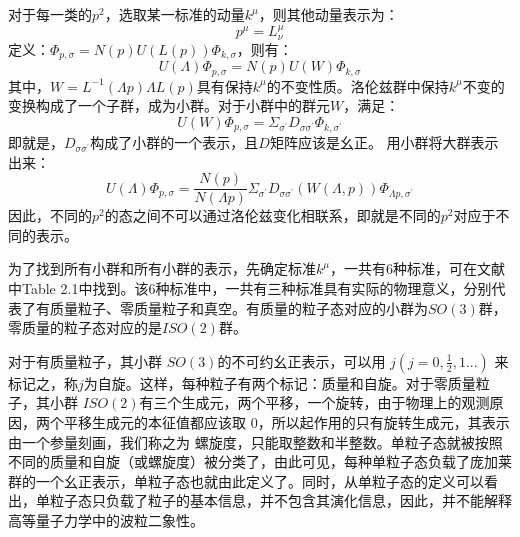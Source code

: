 \documentclass[10pt,a4paper]{article}
\begin{document}
对于每一类的$p^2$，选取某一标准的动量$k^{\mu}$，则其他动量表示为：
\begin{equation}
\label{eq:12}
p^{\mu}=L^{\mu}_{\nu}
\end{equation}
定义：$\Phi_{p,\sigma}=N(p)U(L(p))\Phi_{k,\sigma}$，则有：
\begin{equation}
\label{eq:13}
U(\Lambda)\Phi_{p,\sigma}=N(p)U(W)\Phi_{k,\sigma}
\end{equation}
其中，$W=L^{-1}(\Lambda p)\Lambda L (p)$具有保持$k^{\mu}$的不变性质。洛伦兹群中保持$k^{\mu}$不变的变换构成了一个子群，成为小群。对于小群中的群元$W$，满足：
\begin{equation}
\label{eq:14}
U(W)\Phi_{p,\sigma}=\Sigma_{\sigma^{\prime}}D_{\sigma\sigma^{\prime}}\Phi_{k,\sigma^{\prime}}
\end{equation}
即就是，$D_{\sigma\sigma^{\prime}}$构成了小群的一个表示，且$D$矩阵应该是幺正。
用小群将大群表示出来：
\begin{equation}
\label{eq:15}
U(\Lambda)\Phi_{p,\sigma}=\frac{N(p)}{N(\Lambda p)}\Sigma_{\sigma^{\prime}}D_{\sigma\sigma^{\prime}}(W(\Lambda,p))\Phi_{\Lambda p,\sigma^{\prime}}
\end{equation}
因此，不同的$p^2$的态之间不可以通过洛伦兹变化相联系，即就是不同的$p^2$对应于不同的表示。

为了找到所有小群和所有小群的表示，先确定标准$k^{\mu}$，一共有6种标准，可在文献\cite{wenboge}中Table 2.1中找到。该6种标准中，一共有三种标准具有实际的物理意义，分别代表了有质量粒子、零质量粒子和真空。有质量的粒子态对应的小群为$SO(3)$群，零质量的粒子态对应的是$ISO(2)$群。

对于有质量粒子，其小群 $SO(3)$的不可约幺正表示，可以用 $j(j=0,\frac{1}{2},1...)$ 来标记之，称$j$为自旋。这样，每种粒子有两个标记：质量和自旋。对于零质量粒子，其小群 $ISO(2)$有三个生成元，两个平移，一个旋转，由于物理上的观测原因，两个平移生成元的本征值都应该取 0，所以起作用的只有旋转生成元，其表示由一个参量刻画，我们称之为 螺旋度，只能取整数和半整数。单粒子态就被按照不同的质量和自旋（或螺旋度）被分类了，由此可见，每种单粒子态负载了庞加莱群的一个幺正表示，单粒子态也就由此定义了。同时，从单粒子态的定义可以看出，单粒子态只负载了粒子的基本信息，并不包含其演化信息，因此，并不能解释高等量子力学中的波粒二象性。

\newpage
\end{document}
